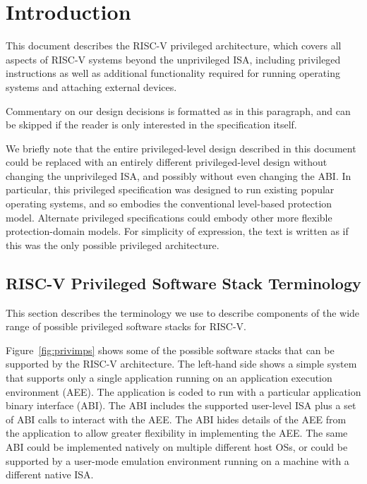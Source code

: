 \chapter{Introduction}

This document describes the RISC-V privileged architecture, which
covers all aspects of RISC-V systems beyond the unprivileged ISA,
including privileged instructions as well as additional functionality
required for running operating systems and attaching external devices.

\begin{commentary}
Commentary on our design decisions is formatted as in this paragraph,
and can be skipped if the reader is only interested in the
specification itself.
\end{commentary}

\begin{commentary}
We briefly note that the entire privileged-level design described in
this document could be replaced with an entirely different
privileged-level design without changing the unprivileged ISA, and
possibly without even changing the ABI.  In particular, this
privileged specification was designed to run existing popular
operating systems, and so embodies the conventional level-based
protection model.  Alternate privileged specifications could embody
other more flexible protection-domain models.  For simplicity of
expression, the text is written as if this was the only possible
privileged architecture.
\end{commentary}

\section{RISC-V Privileged Software Stack Terminology}

This section describes the terminology we use to describe components
of the wide range of possible privileged software stacks for RISC-V.

Figure~\ref{fig:privimps} shows some of the possible software stacks
that can be supported by the RISC-V architecture.  The left-hand side
shows a simple system that supports only a single application running
on an application execution environment (AEE).  The application is
coded to run with a particular application binary interface (ABI).
The ABI includes the supported user-level ISA plus a set of ABI calls to
interact with the AEE.  The ABI hides details of the AEE from the
application to allow greater flexibility in implementing the AEE.  The
same ABI could be implemented natively on multiple different host OSs,
or could be supported by a user-mode emulation environment running on
a machine with a different native ISA.

